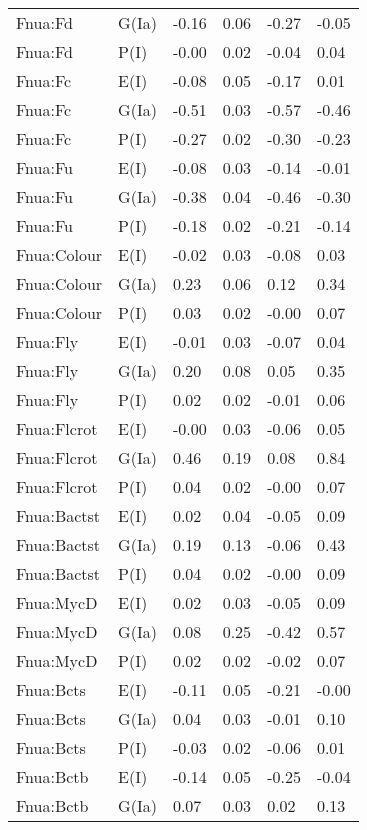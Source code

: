\begin{center}
\begin{longtable}{|p{1.1in}|p{0.7in}|p{0.7in}|p{0.6in}|p{0.6in}|p{0.6in}|}
  Fnua:Fd & G(Ia) & -0.16 & 0.06 & -0.27 & -0.05 \\ 
  Fnua:Fd & P(I) & -0.00 & 0.02 & -0.04 & 0.04 \\ 
  Fnua:Fc & E(I) & -0.08 & 0.05 & -0.17 & 0.01 \\ 
  Fnua:Fc & G(Ia) & -0.51 & 0.03 & -0.57 & -0.46 \\ 
  Fnua:Fc & P(I) & -0.27 & 0.02 & -0.30 & -0.23 \\ 
  Fnua:Fu & E(I) & -0.08 & 0.03 & -0.14 & -0.01 \\ 
  Fnua:Fu & G(Ia) & -0.38 & 0.04 & -0.46 & -0.30 \\ 
  Fnua:Fu & P(I) & -0.18 & 0.02 & -0.21 & -0.14 \\ 
  Fnua:Colour & E(I) & -0.02 & 0.03 & -0.08 & 0.03 \\ 
  Fnua:Colour & G(Ia) & 0.23 & 0.06 & 0.12 & 0.34 \\ 
  Fnua:Colour & P(I) & 0.03 & 0.02 & -0.00 & 0.07 \\ 
  Fnua:Fly & E(I) & -0.01 & 0.03 & -0.07 & 0.04 \\ 
  Fnua:Fly & G(Ia) & 0.20 & 0.08 & 0.05 & 0.35 \\ 
  Fnua:Fly & P(I) & 0.02 & 0.02 & -0.01 & 0.06 \\ 
  Fnua:Flcrot & E(I) & -0.00 & 0.03 & -0.06 & 0.05 \\ 
  Fnua:Flcrot & G(Ia) & 0.46 & 0.19 & 0.08 & 0.84 \\ 
  Fnua:Flcrot & P(I) & 0.04 & 0.02 & -0.00 & 0.07 \\ 
  Fnua:Bactst & E(I) & 0.02 & 0.04 & -0.05 & 0.09 \\ 
  Fnua:Bactst & G(Ia) & 0.19 & 0.13 & -0.06 & 0.43 \\ 
  Fnua:Bactst & P(I) & 0.04 & 0.02 & -0.00 & 0.09 \\ 
  Fnua:MycD & E(I) & 0.02 & 0.03 & -0.05 & 0.09 \\ 
  Fnua:MycD & G(Ia) & 0.08 & 0.25 & -0.42 & 0.57 \\ 
  Fnua:MycD & P(I) & 0.02 & 0.02 & -0.02 & 0.07 \\ 
  Fnua:Bcts & E(I) & -0.11 & 0.05 & -0.21 & -0.00 \\ 
  Fnua:Bcts & G(Ia) & 0.04 & 0.03 & -0.01 & 0.10 \\ 
  Fnua:Bcts & P(I) & -0.03 & 0.02 & -0.06 & 0.01 \\ 
  Fnua:Bctb & E(I) & -0.14 & 0.05 & -0.25 & -0.04 \\ 
  Fnua:Bctb & G(Ia) & 0.07 & 0.03 & 0.02 & 0.13 \\ 

\end{longtable}
\end{center}
